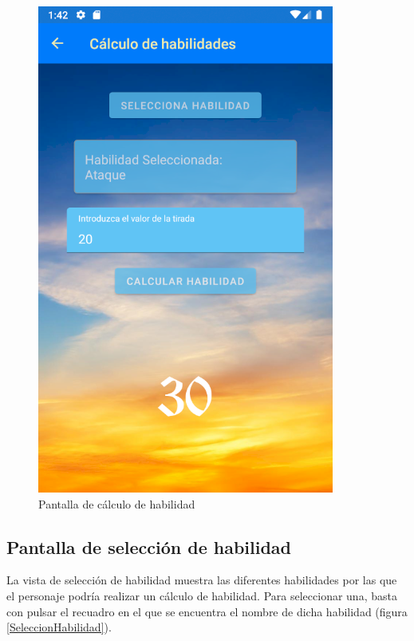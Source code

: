 \begin{figure}[H]
    \centering
    \includegraphics[scale=0.7]{Figures/Capturas/CalcularHabilidad.png}
    \caption{Pantalla de cálculo de habilidad}
    \label{CalculoHabilidad}    
\end{figure}

\subsection{Pantalla de selección de habilidad}
La vista de selección de habilidad muestra las diferentes habilidades por las que el personaje podría 
realizar un cálculo de habilidad. Para seleccionar una, basta con pulsar el recuadro en el que se encuentra 
el nombre de dicha habilidad (figura \ref*{SeleccionHabilidad}).


